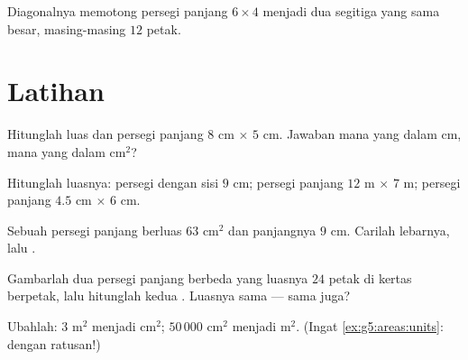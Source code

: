 \begin{omfigure}

{\small Diagonalnya memotong persegi panjang $6 \times 4$ menjadi
dua segitiga yang sama besar, masing-masing $12$ petak.}
\end{omfigure}

\section{Latihan}

\begin{exercise}[$\star$]\label{exo:g5:areas:1}
Hitunglah luas dan  persegi panjang $8$ cm $\times$ $5$ cm.
Jawaban mana yang dalam cm, mana yang dalam cm$^2$?
\end{exercise}

\begin{exercise}[$\star$]\label{exo:g5:areas:2}
Hitunglah luasnya: persegi dengan sisi $9$ cm; persegi panjang
$12$ m $\times$ $7$ m; persegi panjang $4.5$ cm $\times$ $6$ cm.
\end{exercise}

\begin{exercise}[$\star$]\label{exo:g5:areas:3}
Sebuah persegi panjang berluas $63$ cm$^2$ dan panjangnya $9$ cm.
Carilah lebarnya, lalu .
\end{exercise}

\begin{exercise}[$\star$]\label{exo:g5:areas:4}
Gambarlah dua persegi panjang berbeda yang luasnya $24$ petak di
kertas berpetak, lalu hitunglah kedua . Luasnya sama ---  sama juga?
\end{exercise}

\begin{exercise}[$\star$]\label{exo:g5:areas:5}
Ubahlah: $3$ m$^2$ menjadi cm$^2$; \quad $50\,000$ cm$^2$ menjadi
m$^2$. (Ingat \cref{ex:g5:areas:units}: dengan ratusan!)
\end{exercise}

